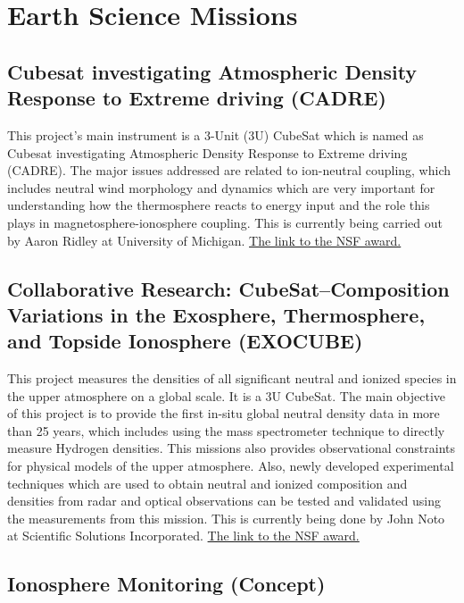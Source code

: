 \section{Earth Science Missions}

\subsection{Cubesat investigating Atmospheric Density Response to Extreme driving (CADRE)}
This project's  main instrument is a 3-Unit (3U) CubeSat which is named as Cubesat investigating Atmospheric Density Response to Extreme driving (CADRE). The major issues addressed are related to ion-neutral coupling, which includes neutral wind morphology and dynamics which are very important for understanding how the thermosphere reacts to energy input and the role this plays in magnetosphere-ionosphere coupling. This is currently being carried out by Aaron Ridley at University of Michigan. \href{http://nsf.gov/awardsearch/showAward?AWD_ID=1042815&HistoricalAwards=false}{The link to the NSF award.}

\subsection{Collaborative Research: CubeSat--Composition Variations in the Exosphere, Thermosphere, and Topside Ionosphere (EXOCUBE)}

This project measures the densities of all significant neutral and ionized species in the upper atmosphere on a global scale. It is a 3U CubeSat. The main objective of this project is to provide the first in-situ global neutral density data in more than 25 years, which includes using the mass spectrometer technique to directly measure Hydrogen densities. This missions also provides observational constraints for physical models of the upper atmosphere. Also, newly developed experimental techniques which are used to obtain neutral and ionized composition and densities from radar and optical observations can be tested and validated using the measurements from this mission. This is currently being done by John Noto at Scientific Solutions Incorporated. \href{http://nsf.gov/awardsearch/showAward?AWD_ID=1042837&HistoricalAwards=false}{The link to the NSF award.}



\subsection{Ionosphere Monitoring (Concept)}

